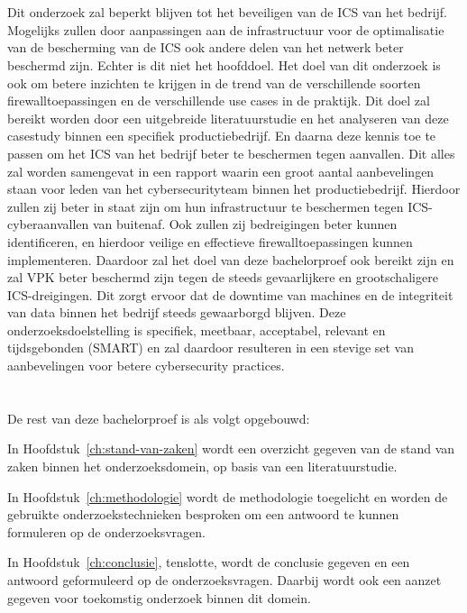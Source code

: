 \section{}%
\label{sec:onderzoeksdoelstelling}

Dit onderzoek zal beperkt blijven tot het beveiligen van de ICS van het bedrijf. Mogelijks zullen door aanpassingen aan de infrastructuur voor de optimalisatie van de bescherming van de ICS ook andere delen van het netwerk beter beschermd zijn. Echter is dit niet het hoofddoel. Het doel van dit onderzoek is ook om betere inzichten te krijgen in de trend van de verschillende soorten firewalltoepassingen en de verschillende use cases in de praktijk. Dit doel zal bereikt worden door een uitgebreide literatuurstudie en het analyseren van deze casestudy binnen een specifiek productiebedrijf. En daarna deze kennis toe te passen om het ICS van het bedrijf beter te beschermen tegen aanvallen. Dit alles zal worden samengevat in een rapport waarin een groot aantal aanbevelingen staan voor leden van het cybersecurityteam binnen het productiebedrijf. Hierdoor zullen zij beter in staat zijn om hun infrastructuur te beschermen tegen ICS-cyberaanvallen van buitenaf. Ook zullen zij bedreigingen beter kunnen identificeren, en hierdoor veilige en effectieve firewalltoepassingen kunnen implementeren. Daardoor zal het doel van deze bachelorproef ook bereikt zijn en zal VPK beter beschermd zijn tegen de steeds gevaarlijkere en grootschaligere ICS-dreigingen. Dit zorgt ervoor dat de downtime van machines en de integriteit van data binnen het bedrijf steeds gewaarborgd blijven. Deze onderzoeksdoelstelling is specifiek, meetbaar, acceptabel, relevant en tijdsgebonden (SMART) en zal daardoor resulteren in een stevige set van aanbevelingen voor betere cybersecurity practices.

\section{}%
\label{sec:opzet-bachelorproef}


De rest van deze bachelorproef is als volgt opgebouwd:

In Hoofdstuk~\ref{ch:stand-van-zaken} wordt een overzicht gegeven van de stand van zaken binnen het onderzoeksdomein, op basis van een literatuurstudie.

In Hoofdstuk~\ref{ch:methodologie} wordt de methodologie toegelicht en worden de gebruikte onderzoekstechnieken besproken om een antwoord te kunnen formuleren op de onderzoeksvragen.


In Hoofdstuk~\ref{ch:conclusie}, tenslotte, wordt de conclusie gegeven en een antwoord geformuleerd op de onderzoeksvragen. Daarbij wordt ook een aanzet gegeven voor toekomstig onderzoek binnen dit domein.